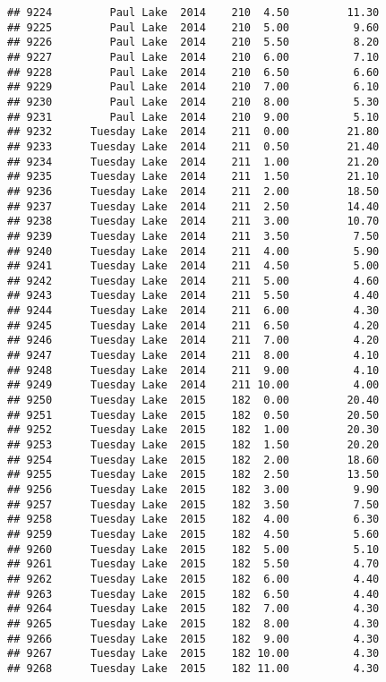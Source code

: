 \documentclass[
]{article}
\begin{document}
\begin{verbatim}
## 9224         Paul Lake  2014    210  4.50         11.30
## 9225         Paul Lake  2014    210  5.00          9.60
## 9226         Paul Lake  2014    210  5.50          8.20
## 9227         Paul Lake  2014    210  6.00          7.10
## 9228         Paul Lake  2014    210  6.50          6.60
## 9229         Paul Lake  2014    210  7.00          6.10
## 9230         Paul Lake  2014    210  8.00          5.30
## 9231         Paul Lake  2014    210  9.00          5.10
## 9232      Tuesday Lake  2014    211  0.00         21.80
## 9233      Tuesday Lake  2014    211  0.50         21.40
## 9234      Tuesday Lake  2014    211  1.00         21.20
## 9235      Tuesday Lake  2014    211  1.50         21.10
## 9236      Tuesday Lake  2014    211  2.00         18.50
## 9237      Tuesday Lake  2014    211  2.50         14.40
## 9238      Tuesday Lake  2014    211  3.00         10.70
## 9239      Tuesday Lake  2014    211  3.50          7.50
## 9240      Tuesday Lake  2014    211  4.00          5.90
## 9241      Tuesday Lake  2014    211  4.50          5.00
## 9242      Tuesday Lake  2014    211  5.00          4.60
## 9243      Tuesday Lake  2014    211  5.50          4.40
## 9244      Tuesday Lake  2014    211  6.00          4.30
## 9245      Tuesday Lake  2014    211  6.50          4.20
## 9246      Tuesday Lake  2014    211  7.00          4.20
## 9247      Tuesday Lake  2014    211  8.00          4.10
## 9248      Tuesday Lake  2014    211  9.00          4.10
## 9249      Tuesday Lake  2014    211 10.00          4.00
## 9250      Tuesday Lake  2015    182  0.00         20.40
## 9251      Tuesday Lake  2015    182  0.50         20.50
## 9252      Tuesday Lake  2015    182  1.00         20.30
## 9253      Tuesday Lake  2015    182  1.50         20.20
## 9254      Tuesday Lake  2015    182  2.00         18.60
## 9255      Tuesday Lake  2015    182  2.50         13.50
## 9256      Tuesday Lake  2015    182  3.00          9.90
## 9257      Tuesday Lake  2015    182  3.50          7.50
## 9258      Tuesday Lake  2015    182  4.00          6.30
## 9259      Tuesday Lake  2015    182  4.50          5.60
## 9260      Tuesday Lake  2015    182  5.00          5.10
## 9261      Tuesday Lake  2015    182  5.50          4.70
## 9262      Tuesday Lake  2015    182  6.00          4.40
## 9263      Tuesday Lake  2015    182  6.50          4.40
## 9264      Tuesday Lake  2015    182  7.00          4.30
## 9265      Tuesday Lake  2015    182  8.00          4.30
## 9266      Tuesday Lake  2015    182  9.00          4.30
## 9267      Tuesday Lake  2015    182 10.00          4.30
## 9268      Tuesday Lake  2015    182 11.00          4.30

\end{verbatim}
\end{document}
